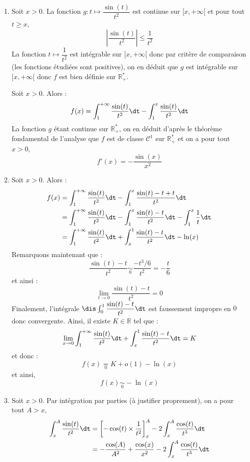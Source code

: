 \documentclass[a4paper,10pt]{report}
\begin{document}
\corr \begin{enumerate}
\item Soit $x>0$. La fonction $g : t \mapsto \dfrac{\sin(t)}{t^2}$ est continue sur $[x, + \infty[$ et pour tout $t \geq x$,
$$ \left\vert \dfrac{\sin(t)}{t^2} \right\vert \leq \dfrac{1}{t^2}$$
La fonction $t \mapsto \dfrac{1}{t^2}$ est intégrable sur $[x, + \infty[$ donc par critère de comparaison (les fonctions étudiées sont positives), on en déduit que $g$ est intégrable sur $[x, + \infty[$ donc $f$ est bien définie sur $\mathbb{R}_+^{*}$.


\medskip

\noindent Soit $x>0$. Alors :
$$ f(x) = \int_{1}^{+ \infty} \dfrac{\sin(t)}{t^2} \dt - \int_{1}^{x} \dfrac{\sin(t)}{t^2} \dt$$
La fonction $g$ étant continue sur $\mathbb{R}_+^{*}$, on en déduit d'après le théorème fondamental de l'analyse que $f$ est de classe $\mathcal{C}^1$ sur $\mathbb{R}_+^{*}$ et on a pour tout $x>0$,
$$ f'(x) = - \dfrac{\sin(x)}{x^2}$$
\item Soit $x>0$. Alors :
\begin{align*}
 f(x) & = \int_{1}^{+ \infty} \dfrac{\sin(t)}{t^2} \dt - \int_{1}^{x} \dfrac{\sin(t)-t+t}{t^2} \dt \\
 & = \int_{1}^{+ \infty} \dfrac{\sin(t)}{t^2} \dt - \int_{1}^{x} \dfrac{\sin(t)-t}{t^2} \dt -\int_{1}^x \dfrac{1}{t} \dt \\
& =  \int_{1}^{+ \infty} \dfrac{\sin(t)}{t^2} \dt + \int_{x}^{1} \dfrac{\sin(t)-t}{t^2} \dt  - \ln(x) 
\end{align*}
Remarquons maintenant que :
$$ \dfrac{\sin(t)-t}{t^2} \underset{0}{\sim} \dfrac{-t^3/6}{t^2} = - \dfrac{t}{6}$$
et ainsi :
$$ \lim_{t \rightarrow 0}  \dfrac{\sin(t)-t}{t^2} =0$$
Finalement, l'intégrale $\dis \int_{0}^{1} \dfrac{\sin(t)-t}{t^2} \dt$ est faussement impropre en $0$ donc convergente. Ainsi, il existe $K \in \mathbb{R}$ tel que :
$$ \lim_{x \rightarrow 0}  \int_{1}^{+ \infty} \dfrac{\sin(t)}{t^2} \dt + \int_{x}^{1} \dfrac{\sin(t)-t}{t^2} \dt = K$$
et donc :
$$ f(x) \underset{0}{=} K + o(1) - \ln(x)$$
et ainsi,
$$f(x) \underset{0}{\sim} -\ln(x)$$
\item Soit $x>0$. Par intégration par parties (à justifier proprement), on a pour tout $A>x$,
\begin{align*}
 \int_{x}^A \dfrac{\sin(t)}{t^2} \dt & = \left[- \cos(t) \times \dfrac{1}{t^2} \right]_x^A -2 \int_{x}^A \dfrac{\cos(t)}{t^3} \dt \\
  & = - \dfrac{\cos(A)}{A^2} + \dfrac{\cos(x)}{x^2} -2 \int_{x}^A \dfrac{\cos(t)}{t^3} \dt \\

\end{align*}
\end{enumerate}
\end{document}
